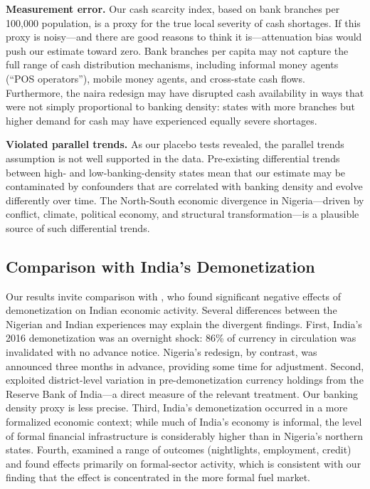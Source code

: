 \documentclass[12pt]{article}
\begin{document}
\textbf{Measurement error.} Our cash scarcity index, based on bank branches per 100,000 population, is a proxy for the true local severity of cash shortages. If this proxy is noisy---and there are good reasons to think it is---attenuation bias would push our estimate toward zero. Bank branches per capita may not capture the full range of cash distribution mechanisms, including informal money agents (``POS operators''), mobile money agents, and cross-state cash flows. Furthermore, the naira redesign may have disrupted cash availability in ways that were not simply proportional to banking density: states with more branches but higher demand for cash may have experienced equally severe shortages.

\textbf{Violated parallel trends.} As our placebo tests revealed, the parallel trends assumption is not well supported in the data. Pre-existing differential trends between high- and low-banking-density states mean that our estimate may be contaminated by confounders that are correlated with banking density and evolve differently over time. The North-South economic divergence in Nigeria---driven by conflict, climate, political economy, and structural transformation---is a plausible source of such differential trends.

\subsection{Comparison with India's Demonetization}

Our results invite comparison with \citet{chodorow2020cash}, who found significant negative effects of demonetization on Indian economic activity. Several differences between the Nigerian and Indian experiences may explain the divergent findings. First, India's 2016 demonetization was an overnight shock: 86\% of currency in circulation was invalidated with no advance notice. Nigeria's redesign, by contrast, was announced three months in advance, providing some time for adjustment. Second, \citet{chodorow2020cash} exploited district-level variation in pre-demonetization currency holdings from the Reserve Bank of India---a direct measure of the relevant treatment. Our banking density proxy is less precise. Third, India's demonetization occurred in a more formalized economic context; while much of India's economy is informal, the level of formal financial infrastructure is considerably higher than in Nigeria's northern states. Fourth, \citet{chodorow2020cash} examined a range of outcomes (nightlights, employment, credit) and found effects primarily on formal-sector activity, which is consistent with our finding that the effect is concentrated in the more formal fuel market.
\end{document}
